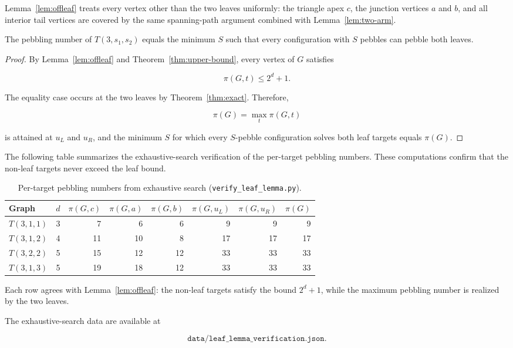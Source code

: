 Lemma~\ref{lem:offleaf} treats every vertex other than the two leaves uniformly:
the triangle apex $c$, the junction vertices $a$ and $b$, and all interior tail
vertices are covered by the same spanning-path argument combined with
Lemma~\ref{lem:two-arm}.


\begin{corollary}
\label{cor:pruning}

The pebbling number of $T(3,s_1,s_2)$ equals the minimum $S$ such that every
configuration with $S$ pebbles can pebble both leaves.

\end{corollary}


\begin{proof}

By Lemma~\ref{lem:offleaf} and Theorem~\ref{thm:upper-bound}, every vertex of
$G$ satisfies

\[
\pi(G,t)\le2^d+1.
\]

The equality case occurs at the two leaves by Theorem~\ref{thm:exact}.
Therefore,

\[
\pi(G)=\max_t\pi(G,t)
\]

is attained at $u_L$ and $u_R$, and the minimum $S$ for which every
$S$-pebble configuration solves both leaf targets equals $\pi(G)$.

\end{proof}



The following table summarizes the exhaustive-search verification of the
per-target pebbling numbers. These computations confirm that the non-leaf
targets never exceed the leaf bound.


\begin{table}[ht]
\centering

\caption{Per-target pebbling numbers from exhaustive search
(\texttt{verify\_leaf\_lemma.py}).}

\label{tab:leaf-verify}

\begin{tabular}{lrrrrrrr}
\hline
Graph & $d$ & $\pi(G,c)$ & $\pi(G,a)$ & $\pi(G,b)$ &
$\pi(G,u_L)$ & $\pi(G,u_R)$ & $\pi(G)$ \\
\hline
$T(3,1,1)$ & 3 & 7  & 6  & 6  & 9  & 9  & 9  \\
$T(3,1,2)$ & 4 & 11 & 10 & 8  & 17 & 17 & 17 \\
$T(3,2,2)$ & 5 & 15 & 12 & 12 & 33 & 33 & 33 \\
$T(3,1,3)$ & 5 & 19 & 18 & 12 & 33 & 33 & 33 \\
\hline
\end{tabular}

\end{table}


Each row agrees with Lemma~\ref{lem:offleaf}: the non-leaf targets satisfy the
bound $2^d+1$, while the maximum pebbling number is realized by the two leaves.


The exhaustive-search data are available at

\[
\texttt{data/leaf\_lemma\_verification.json}.
\]